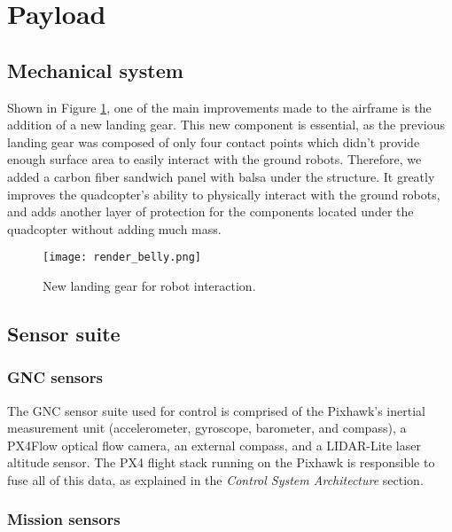 \section*{Payload} \label{sec:payload}

\subsection*{Mechanical system} \label{subsec:payload-mechsystem}

Shown in Figure \ref{fig:payload-mech}, one of the main improvements made to the airframe is the addition of a new landing gear. This new component is essential, as the previous landing gear was composed of only four contact points which didn’t provide enough surface area to easily interact with the ground robots. Therefore, we added a carbon fiber sandwich panel with balsa under the structure. It greatly improves the quadcopter’s ability to physically interact with the ground robots, and adds another layer of protection for the components located under the quadcopter without adding much mass.

\begin{figure}[h]
	\texttt{[image: render\_belly.png]}
	\vspace{-0.5cm}
	\caption{New landing gear for robot interaction.}
	\label{fig:payload-mech}
\end{figure}

\subsection*{Sensor suite} \label{subsec:payload-sensors}

\subsubsection*{GNC sensors}

The GNC sensor suite used for control is comprised of the Pixhawk’s inertial measurement unit (accelerometer, gyroscope, barometer, and compass), a PX4Flow optical flow camera, an external compass, and a LIDAR-Lite laser altitude sensor. The PX4 flight stack running on the Pixhawk is responsible to fuse all of this data, as explained in the \textit{Control System Architecture} section. 

\subsubsection*{Mission sensors}

